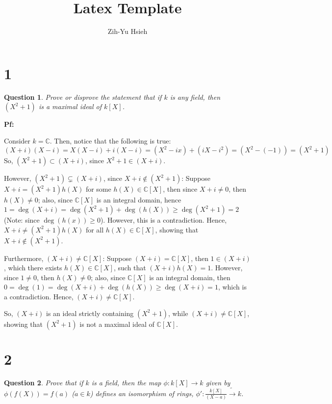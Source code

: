\documentclass{article}
\title{Latex Template}
\author{Zih-Yu Hsieh}
\newtheorem{question}{Question}
\begin{document}
\maketitle

\section*{1}
\begin{myBox}[]{}
    \begin{question}
        Prove or disprove the statement that if $k$ is any field, then $(X^2+1)$ is a maximal
        ideal of $k[X]$.
    \end{question}
\end{myBox}

\textbf{Pf:}

Consider $k=\mathbb{C}$. Then, notice that the following is true: 
$$(X+i)(X-i)=X(X-i)+i(X-i)=(X^2-ix)+(iX-i^2)=(X^2-(-1))=(X^2+1)$$
So, $(X^2+1)\subset (X+i)$, since $X^2+1\in (X+i)$.

\hfill

However, $(X^2+1)\subsetneq (X+i)$, since $X+i\notin (X^2+1)$:
Suppose $X+i=(X^2+1)h(X)$ for some $h(X)\in \mathbb{C}[X]$, then since $X+i\neq 0$, then $h(X)\neq 0$;
also, since $\mathbb{C}[X]$ is an integral domain, hence $1=\deg(X+i)=\deg(X^2+1)+\deg(h(X)) \geq \deg(X^2+1)=2$ (Note: since $\deg(h(x))\geq 0$).
However, this is a contradiction. Hence, $X+i\neq (X^2+1)h(X)$ for all $h(X)\in \mathbb{C}[X]$, showing that $X+i\notin (X^2+1)$.

\hfill

Furthermore, $(X+i)\neq \mathbb{C}[X]$: Suppose $(X+i)=\mathbb{C}[X]$, then $1\in (X+i)$, which there exists $h(X)\in\mathbb{C}[X]$,
such that $(X+i)h(X)=1$. However, since $1\neq 0$, then $h(X)\neq 0$; also, since $\mathbb{C}[X]$ is an integral domain, then
$0=\deg(1)=\deg(X+i)+\deg(h(X))\geq \deg(X+i)=1$, which is a contradiction. 
Hence, $(X+i)\neq \mathbb{C}[X]$.

\hfill

So, $(X+i)$ is an ideal strictly containing $(X^2+1)$, while $(X+i)\neq \mathbb{C}[X]$, showing that $(X^2+1)$ is not a maximal ideal of $\mathbb{C}[X]$.

\hfill

\hfill

\section*{2}
\begin{myBox}[]{}
    \begin{question}
        Prove that if $k$ is a field, then the map $\phi:k[X]\rightarrow k$ given by $\phi(f(X))=f(a)$ ($a\in k$) defines
        an isomorphism of rings, $\phi':\frac{k[X]}{(X-a)}\tilde\rightarrow k$.
    \end{question}
\end{myBox}
\end{document}

